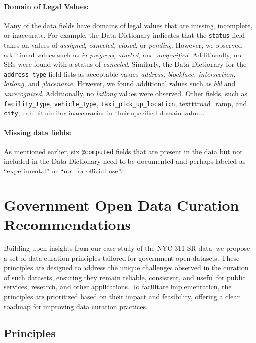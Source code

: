 \documentclass[linenumber]{jdsart}
\begin{document}
\paragraph{Domain of Legal Values:} Many of the data fields have
domains of legal values that are missing, incomplete, or inaccurate. For 
example, the Data Dictionary indicates 
that the \texttt{status} field takes on values of \textit{assigned, canceled, 
closed}, or \textit{pending}. However, we observed additional values 
such as \textit{in progress, started}, and \textit{unspecified}. Additionally, 
no SRs were found with a status of \textit{canceled}. Similarly, 
the Data Dictionary for the \texttt{address\_type} field lists as acceptable
values \textit{address, blockface, intersection, latlong}, and 
\textit{placename}. However, we found additional values such 
as \textit{bbl} and \textit{unrecognized}. Additionally, no 
\textit{latlong} values were observed. Other fields, such 
as \texttt{facility\_type}, \texttt{vehicle\_type}, \texttt{taxi\_pick\_up\_location},
texttt{road\_ramp}, and \texttt{city}, exhibit similar inaccuracies 
in their specified domain values.

\paragraph{Missing data fields:} As mentioned earlier, six \texttt{@computed} 
fields that are present in the data but not included in 
the Data Dictionary need to be documented and perhaps 
labeled as ``experimental'' or ``not for official use''.


\section{Government Open Data Curation Recommendations}
\label{sec:recommendations}
Building upon  insights from our case study of the 
NYC 311 SR data, we propose a set of data 
curation principles tailored for government open datasets. 
These principles are designed to address the unique challenges 
 observed in the curation of such datasets, 
ensuring they remain reliable, consistent, and useful for 
public services, research, and other applications.
To facilitate implementation, the principles are prioritized based on
their impact and feasibility, offering a clear roadmap for improving
data curation practices.


\subsection{Principles}
\end{document}
